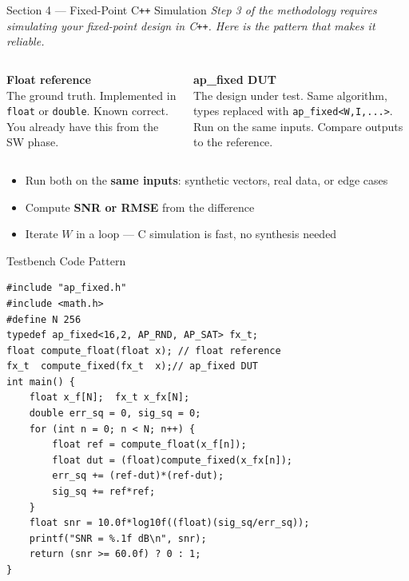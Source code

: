 \documentclass[aspectratio=169,12pt]{beamer}
\begin{document}
\begin{frame}{Section 4 --- Fixed-Point C\texttt{++} Simulation}
\vspace{0.05cm}
{\color{MidGray}\small\itshape
  Step 3 of the methodology requires simulating your fixed-point design in C\texttt{++}.
  Here is the pattern that makes it reliable.}
\vspace{0.11cm}
\begin{columns}[T,totalwidth=\textwidth]
  \colorbox{Navy!10}{\parbox{\dimexpr\linewidth-2\fboxsep\relax}{%
    \vspace{2pt}
    {\color{Navy}\bfseries Float reference}\\[1pt]
    {\small The ground truth. Implemented in \texttt{float} or \texttt{double}.
    Known correct. You already have this from the SW phase.}
    \vspace{2pt}
  }}
  \colorbox{Teal!10}{\parbox{\dimexpr\linewidth-2\fboxsep\relax}{%
    \vspace{2pt}
    {\color{Teal}\bfseries ap\_fixed DUT}\\[1pt]
    {\small The design under test. Same algorithm, types replaced
    with \texttt{ap\_fixed<W,I,...>}. Run on the same inputs.
    Compare outputs to the reference.}
    \vspace{2pt}
  }}
\end{columns}
\vspace{0.11cm}
\begin{itemize}\setlength{\itemsep}{2pt}
  \item[\color{Orange}$\blacktriangleright$]
    Run both on the \textbf{same inputs}: synthetic vectors, real data, or edge cases
  \item[\color{Navy}$\blacktriangleright$]
    Compute \textbf{SNR or RMSE} from the difference
  \item[\color{Teal}$\blacktriangleright$]
    Iterate $W$ in a loop --- C simulation is fast, no synthesis needed
\end{itemize}
\end{frame}

\begin{frame}[fragile]{Testbench Code Pattern}
\begin{lstlisting}[basicstyle=\ttfamily\scriptsize,aboveskip=1pt,belowskip=0pt]
#include "ap_fixed.h"
#include <math.h>
#define N 256
typedef ap_fixed<16,2, AP_RND, AP_SAT> fx_t;
float compute_float(float x); // float reference
fx_t  compute_fixed(fx_t  x);// ap_fixed DUT
int main() {
    float x_f[N];  fx_t x_fx[N];
    double err_sq = 0, sig_sq = 0;
    for (int n = 0; n < N; n++) {
        float ref = compute_float(x_f[n]);
        float dut = (float)compute_fixed(x_fx[n]);
        err_sq += (ref-dut)*(ref-dut);
        sig_sq += ref*ref;
    }
    float snr = 10.0f*log10f((float)(sig_sq/err_sq));
    printf("SNR = %.1f dB\n", snr);
    return (snr >= 60.0f) ? 0 : 1;
}
\end{lstlisting}
\end{frame}
\end{document}
